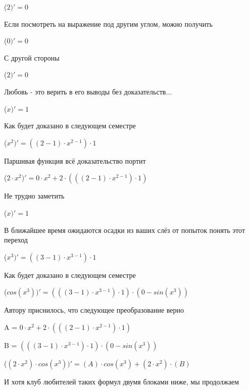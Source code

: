 \documentclass[12pt,a4paper,fleqn]{article}
\begin{document}
\begin{center}
 ($2)'
  = 0$\end{center}
Если посмотреть на выражение под другим углом, можно получить

\begin{center}
 ($0)'
  = 0$\end{center}
С другой стороны

\begin{center}
 ($2)'
  = 0$\end{center}
Любовь - это верить в его выводы без доказательств...

\begin{center}
 ($x)'
  = 1$\end{center}
Как будет доказано в следующем семестре

\begin{center}
 ($x^{2})'
  = ((2-1) \cdot x^{2-1}) \cdot 1$\end{center}
Паршивая функция всё доказательство портит\cite{link2}

\begin{center}
 ($2 \cdot x^{2})'
  = 0 \cdot x^{2}+2 \cdot (((2-1) \cdot x^{2-1}) \cdot 1)$\end{center}
Не трудно заметить

\begin{center}
 ($x)'
  = 1$\end{center}
В ближайшее время ожидаются осадки из ваших слёз от попыток понять этот переход

\begin{center}
 ($x^{3})'
  = ((3-1) \cdot x^{3-1}) \cdot 1$\end{center}
Как будет доказано в следующем семестре

\begin{center}
 ($cos(x^{3}))'
  = (((3-1) \cdot x^{3-1}) \cdot 1) \cdot (0-sin(x^{3}))$\end{center}
Автору приснилось, что следующее преобразование верно

\begin{center}
A = $0 \cdot x^{2}+2 \cdot (((2-1) \cdot x^{2-1}) \cdot 1)$\end{center}
\begin{center}
B = $(((3-1) \cdot x^{3-1}) \cdot 1) \cdot (0-sin(x^{3}))$\end{center}
\begin{center}
 ($(2 \cdot x^{2}) \cdot cos(x^{3}))'
  = (A) \cdot cos(x^{3})+(2 \cdot x^{2}) \cdot (B)$\end{center}
И хотя клуб любителей таких формул двумя блоками ниже, мы продолжаем
\end{document}
